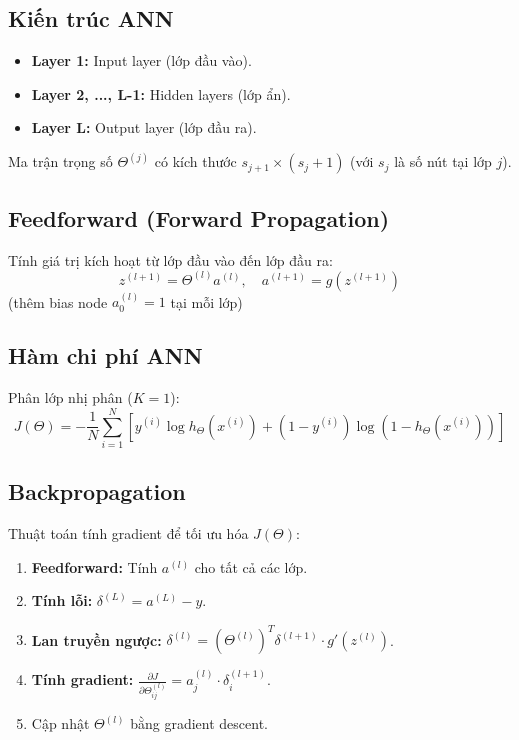 \documentclass[10pt]{article}
\begin{document}
\subsection{Kiến trúc ANN}

\begin{itemize}
    \item \textbf{Layer 1:} Input layer (lớp đầu vào).
    \item \textbf{Layer 2, ..., L-1:} Hidden layers (lớp ẩn).
    \item \textbf{Layer L:} Output layer (lớp đầu ra).
\end{itemize}

Ma trận trọng số $\Theta^{(j)}$ có kích thước $s_{j+1} \times (s_j + 1)$ (với $s_j$ là số nút tại lớp $j$).

\subsection{Feedforward (Forward Propagation)}

Tính giá trị kích hoạt từ lớp đầu vào đến lớp đầu ra:
\[
z^{(l+1)} = \Theta^{(l)} a^{(l)}, \quad a^{(l+1)} = g(z^{(l+1)})
\]
(thêm bias node $a_0^{(l)} = 1$ tại mỗi lớp)

\subsection{Hàm chi phí ANN}

Phân lớp nhị phân ($K=1$):
\[
J(\Theta) = -\frac{1}{N}\sum_{i=1}^{N}\left[y^{(i)}\log h_\Theta(x^{(i)}) + (1-y^{(i)})\log(1-h_\Theta(x^{(i)}))\right]
\]

\subsection{Backpropagation}

Thuật toán tính gradient để tối ưu hóa $J(\Theta)$:
\begin{enumerate}
    \item \textbf{Feedforward:} Tính $a^{(l)}$ cho tất cả các lớp.
    \item \textbf{Tính lỗi:} $\delta^{(L)} = a^{(L)} - y$.
    \item \textbf{Lan truyền ngược:} $\delta^{(l)} = (\Theta^{(l)})^T\delta^{(l+1)} \cdot g'(z^{(l)})$.
    \item \textbf{Tính gradient:} $\frac{\partial J}{\partial \Theta^{(l)}_{ij}} = a^{(l)}_j \cdot \delta^{(l+1)}_i$.
    \item Cập nhật $\Theta^{(l)}$ bằng gradient descent.
\end{enumerate}
\end{document}
